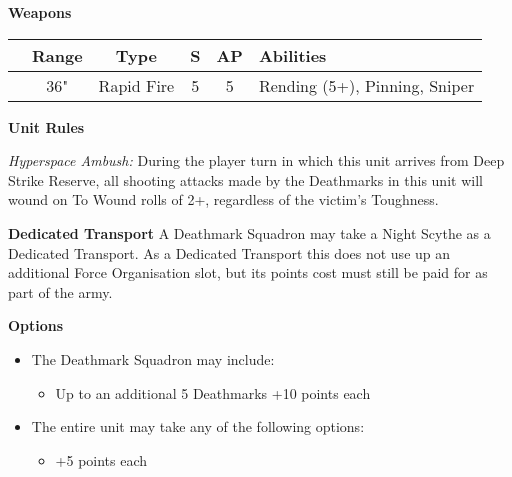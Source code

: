 \begin{minipage}[t]{0.72\textwidth}
	\vspace*{2em}
	\textbf{Weapons}
	
	\begin{tabular}{m{95 pt} *{4}{c} >{\raggedright\arraybackslash}p{130pt}}
		& Range & Type & S & AP & Abilities \\
		\hline
		\quickref{Synaptic Disintegrator} & 36" & Rapid Fire & 5 & 5 & Rending (5+), Pinning, Sniper \\
	\end{tabular}
	
	\vspace*{2em}
	\textbf{Unit Rules}
	
	\textit{Hyperspace Ambush:}  During the player turn in which this unit arrives from Deep Strike Reserve, all shooting attacks made by the Deathmarks in this unit will wound on To Wound rolls of 2+, regardless of the victim’s Toughness.
	
	\vspace*{2em}
	\textbf{Dedicated Transport}
	A Deathmark Squadron may take a Night Scythe as a Dedicated Transport. As a Dedicated Transport this does not use up an additional Force Organisation slot, but its points cost must still be paid for as part of the army.
	
	\vspace*{2em}
	\textbf{Options}
	\begin{itemize}
		\item The Deathmark Squadron may include:
		\begin{itemize}
			\item Up to an additional 5 Deathmarks \dotfill +10 points each
		\end{itemize}
		\item The entire unit may take any of the following options:
		\begin{itemize}
			\item {} \dotfill +5 points each
		\end{itemize}
	\end{itemize}
\end{minipage}
\hspace{0.5em}


\newpage
\subsubsection[C'Tan Shard of Aza'gorod, the Nightbringer]{}

